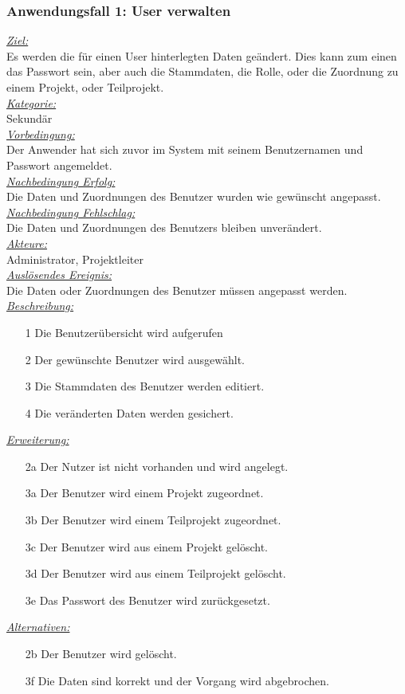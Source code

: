\subsubsection{Anwendungsfall 1: User verwalten}
\underline{\emph{Ziel:}}\\
Es werden die für einen User hinterlegten Daten geändert. Dies kann zum einen das Passwort sein, aber auch die Stammdaten, die Rolle, oder die Zuordnung zu einem Projekt, oder Teilprojekt.\\
\underline{\emph{Kategorie:}} \\
Sekundär\\
\underline{\emph{Vorbedingung:}} \\
Der Anwender hat sich zuvor im System mit seinem Benutzernamen und Passwort angemeldet.\\
\underline{\emph{Nachbedingung Erfolg:}} \\
Die Daten und Zuordnungen des Benutzer wurden wie gewünscht angepasst.\\
\underline{\emph{Nachbedingung Fehlschlag:}} \\
Die Daten und Zuordnungen des Benutzers bleiben unverändert.\\
\underline{\emph{Akteure:}} \\
Administrator, Projektleiter\\
\underline{\emph{Auslösendes Ereignis:}} \\
Die Daten oder Zuordnungen des Benutzer müssen angepasst werden.\\
\underline{\emph{Beschreibung:}}
\begin{itemize}
    \item [1] Die Benutzerübersicht wird aufgerufen
    \item [2] Der gewünschte Benutzer wird ausgewählt.
    \item [3] Die Stammdaten des Benutzer werden editiert.
    \item [4] Die veränderten Daten werden gesichert.
\end{itemize}
\underline{\emph{Erweiterung:}}
\begin{itemize}
    \item [2a] Der Nutzer ist nicht vorhanden und wird angelegt.
    \item [3a] Der Benutzer wird einem Projekt zugeordnet.
    \item [3b] Der Benutzer wird einem Teilprojekt zugeordnet.
    \item [3c] Der Benutzer wird aus einem Projekt gelöscht.
    \item [3d] Der Benutzer wird aus einem Teilprojekt gelöscht.
    \item [3e] Das Passwort des Benutzer wird zurückgesetzt.
\end{itemize}
\underline{\emph{Alternativen:}}
\begin{itemize}
    \item [2b] Der Benutzer wird gelöscht.
    \item [3f] Die Daten sind korrekt und der Vorgang wird abgebrochen.
\end{itemize}

